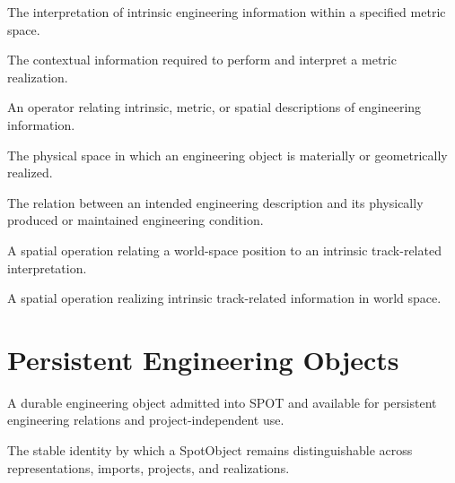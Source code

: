 {The interpretation of intrinsic engineering information within a
specified metric space.}

{The contextual information required to perform and interpret a metric
realization.}

{An operator relating intrinsic, metric, or spatial descriptions of
engineering information.}

{The physical space in which an engineering object is materially or
geometrically realized.}

{The relation between an intended engineering description and its
physically produced or maintained engineering condition.}

{A spatial operation relating a world-space position to an intrinsic
track-related interpretation.}

{A spatial operation realizing intrinsic track-related information in
world space.}

\section*{Persistent Engineering Objects}

{A durable engineering object admitted into SPOT and available for
persistent engineering relations and project-independent use.}

{The stable identity by which a SpotObject remains distinguishable
across representations, imports, projects, and realizations.}
